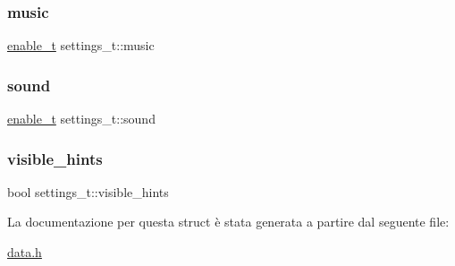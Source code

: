 \subsubsection{\texorpdfstring{music}{music}}
{\footnotesize\ttfamily \hyperlink{data_8h_a56839c56ca6deb3cff5e21540ddb8218}{enable\+\_\+t} settings\+\_\+t\+::music}

\mbox{\label{structsettings__t_a2aa1ff1ddeee8e7ac3d1e544af1c2d67}} 
\subsubsection{\texorpdfstring{sound}{sound}}
{\footnotesize\ttfamily \hyperlink{data_8h_a56839c56ca6deb3cff5e21540ddb8218}{enable\+\_\+t} settings\+\_\+t\+::sound}

\mbox{\label{structsettings__t_a824c2f3df8afc1c1823769065bd6eeb3}} 
\subsubsection{\texorpdfstring{visible\+\_\+hints}{visible\_hints}}
{\footnotesize\ttfamily bool settings\+\_\+t\+::visible\+\_\+hints}



La documentazione per questa struct è stata generata a partire dal seguente file\+:\begin{DoxyCompactItemize}
\item 
\hyperlink{data_8h}{data.\+h}\end{DoxyCompactItemize}
